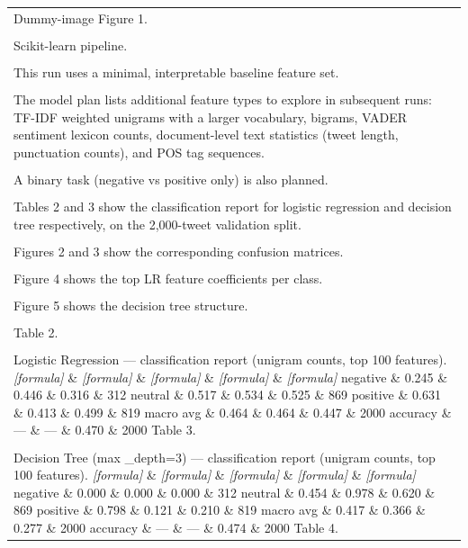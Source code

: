 \documentclass[11pt]{article}
\begin{document}
\begin{longtable}{|p{\dimexpr\linewidth-2\tabcolsep-2\arrayrulewidth\relax}|}
\hline
\rule{0pt}{3.5cm} \\
\hline
Dummy-image Figure 1. \\[2pt]
\hline
\rule{0pt}{3.5cm} \\
\hline
Scikit-learn pipeline. \\[2pt]
\hline
\rule{0pt}{3.5cm} \\
\hline
This run uses a minimal, interpretable baseline feature set. \\[2pt]
\hline
\rule{0pt}{3.5cm} \\
\hline
The model plan lists additional feature types to explore in subsequent runs: TF-IDF weighted unigrams with a larger vocabulary, bigrams, VADER sentiment lexicon counts, document-level text statistics (tweet length, punctuation counts), and POS tag sequences. \\[2pt]
\hline
\rule{0pt}{3.5cm} \\
\hline
A binary task (negative vs positive only) is also planned. \\[2pt]
\hline
\rule{0pt}{3.5cm} \\
\hline
Tables 2 and 3 show the classification report for logistic regression and decision tree respectively, on the 2,000-tweet validation split. \\[2pt]
\hline
\rule{0pt}{3.5cm} \\
\hline
Figures 2 and 3 show the corresponding confusion matrices. \\[2pt]
\hline
\rule{0pt}{3.5cm} \\
\hline
Figure 4 shows the top LR feature coefficients per class. \\[2pt]
\hline
\rule{0pt}{3.5cm} \\
\hline
Figure 5 shows the decision tree structure. \\[2pt]
\hline
\rule{0pt}{3.5cm} \\
\hline
Table 2. \\[2pt]
\hline
\rule{0pt}{3.5cm} \\
\hline
Logistic Regression --- classification report (unigram counts, top 100 features). \textit{[formula]} \& \textit{[formula]} \& \textit{[formula]} \& \textit{[formula]} \& \textit{[formula]} negative \& 0.245 \& 0.446 \& 0.316 \& 312 neutral \& 0.517 \& 0.534 \& 0.525 \& 869 positive \& 0.631 \& 0.413 \& 0.499 \& 819 macro avg \& 0.464 \& 0.464 \& 0.447 \& 2000 accuracy \& --- \& --- \& 0.470 \& 2000 Table 3. \\[2pt]
\hline
\rule{0pt}{3.5cm} \\
\hline
Decision Tree (max \_depth=3) --- classification report (unigram counts, top 100 features). \textit{[formula]} \& \textit{[formula]} \& \textit{[formula]} \& \textit{[formula]} \& \textit{[formula]} negative \& 0.000 \& 0.000 \& 0.000 \& 312 neutral \& 0.454 \& 0.978 \& 0.620 \& 869 positive \& 0.798 \& 0.121 \& 0.210 \& 819 macro avg \& 0.417 \& 0.366 \& 0.277 \& 2000 accuracy \& --- \& --- \& 0.474 \& 2000 Table 4. \\[2pt]

\end{longtable}
\end{document}
